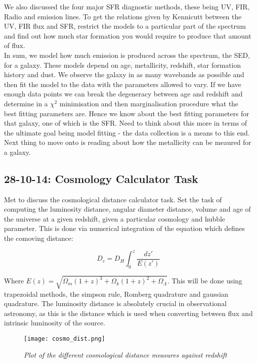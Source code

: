 \documentclass{literature}
\begin{document}
We also discussed the four major SFR diagnostic methods, these being UV, FIR, Radio and emission lines. To get the relations given by Kennicutt between the UV, FIR flux and SFR, restrict the models to a particular part of the spectrum and find out how much star formation you would require to produce that amount of flux. \\
In sum, we model how much emission is produced across the spectrum, the SED, for a galaxy. These models depend on age, metallicity, redshift, star formation history and dust. We observe the galaxy in as many wavebands as possible and then fit the model to the data with the parameters allowed to vary. If we have enough data points we can break the degeneracy between age and redshift and determine in a $\chi ^{2}$ minimisation and then marginalisation procedure what the best fitting parameters are. Hence we know about the best fitting parameters for that galaxy, one of which is the SFR. Need to think about this more in terms of the ultimate goal being model fitting - the data collection is a means to this end. Next thing to move onto is reading about how the metallicity can be meaured for a galaxy. 
\subsection{28-10-14: Cosmology Calculator Task}\label{meeting_2}
Met to discuss the cosmological distance calculator task. Set the task of computing the luminosity distance, angular diameter distance, volume and age of the universe at a given redshift, given a particular cosmology and hubble parameter. This is done via numerical integration of the equation which defines the comoving distance: 

\begin{equation}
D_{c} = D_{H} \int ^{z} _{0}\frac{dz\prime}{E(z\prime)} 
\end{equation}

Where $E(z) = \sqrt{\Omega _{m}(1 + z)^{3} + \Omega _{k}(1 + z)^{2} + \Omega _{\Lambda}}$. This will be done using trapezoidal methods, the simpson rule, Romberg quadrature and gaussian quadrature. The luminosity distance is absolutely crucial in observational astronomy, as this is the distance which is used when converting between flux and intrinsic luminosity of the source.

\begin{figure}[!htp]
\centering
\texttt{[image: cosmo\_dist.png]}
\caption{\footnotesize{\emph{Plot of the different cosmological distance measures against redshift}}}
\label{fig:cosmo_dist}
\end{figure}
\end{document}

